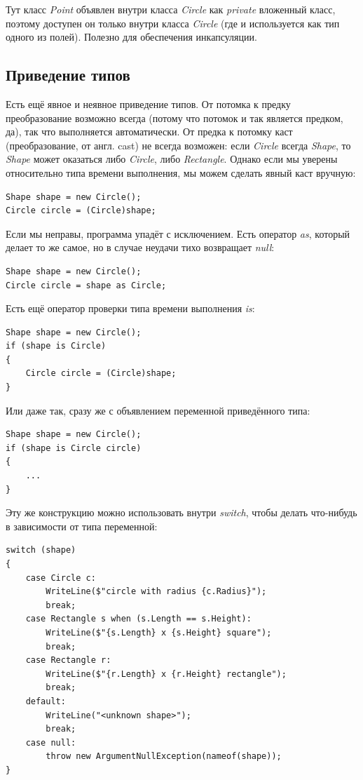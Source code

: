 \documentclass[a5paper]{article}
\begin{document}
Тут класс \textit{Point} объявлен внутри класса \textit{Circle} как \textit{private} вложенный класс, поэтому доступен он только внутри класса \textit{Circle} (где и используется как тип одного из полей). Полезно для обеспечения инкапсуляции.

\subsection{Приведение типов}

Есть ещё явное и неявное приведение типов. От потомка к предку преобразование возможно всегда (потому что потомок и так является предком, да), так что выполняется автоматически. От предка к потомку каст (преобразование, от англ. cast) не всегда возможен: если \textit{Circle} всегда \textit{Shape}, то \textit{Shape} может оказаться либо \textit{Circle}, либо \textit{Rectangle}. Однако если мы уверены относительно типа времени выполнения, мы можем сделать явный каст вручную: 

\begin{verbatim}
Shape shape = new Circle();
Circle circle = (Circle)shape;
\end{verbatim}

Если мы неправы, программа упадёт с исключением. Есть оператор \textit{as}, который делает то же самое, но в случае неудачи тихо возвращает \textit{null}:

\begin{verbatim}
Shape shape = new Circle();
Circle circle = shape as Circle;
\end{verbatim}

Есть ещё оператор проверки типа времени выполнения \textit{is}:

\begin{verbatim}
Shape shape = new Circle();
if (shape is Circle) 
{
    Circle circle = (Circle)shape;
}
\end{verbatim}

Или даже так, сразу же с объявлением переменной приведённого типа:

\begin{verbatim}
Shape shape = new Circle();
if (shape is Circle circle) 
{
    ...
}
\end{verbatim}

Эту же конструкцию можно использовать внутри \textit{switch}, чтобы делать что-нибудь в зависимости от типа переменной:

\begin{verbatim}
switch (shape)
{
    case Circle c:
        WriteLine($"circle with radius {c.Radius}");
        break;
    case Rectangle s when (s.Length == s.Height):
        WriteLine($"{s.Length} x {s.Height} square");
        break;
    case Rectangle r:
        WriteLine($"{r.Length} x {r.Height} rectangle");
        break;
    default:
        WriteLine("<unknown shape>");
        break;
    case null:
        throw new ArgumentNullException(nameof(shape));
}
\end{verbatim}
\end{document}
